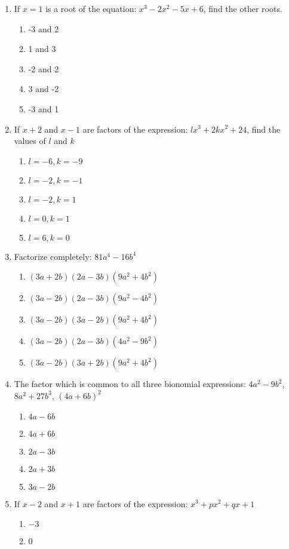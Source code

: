 \begin{multicols}{2}
\begin{enumerate}[label={\arabic*.}]
\item If \(x=1\) is a root of the equation: \(x^3-2x^2-5x+6\), find the other roots.
	\begin{enumerate}[label={\Alph*.}]
	\item -3 and 2
	\item 1 and 3
	\item -2 and 2
	\item 3 and -2
	\item -3 and 1
	\end{enumerate}
\item If \(x+2\) and \(x-1\) are factors of the expression: \(lx^3+2kx^2+24\), find the values of \(l\) and \(k\)
	\begin{enumerate}[label={\Alph*.}]
	\item \(l=-6, k=-9\)
	\item \(l=-2, k=-1\)
	\item \(l=-2, k=1\)
	\item \(l=0, k=1\)
	\item \(l=6, k=0\)
	\end{enumerate}
\item Factorize completely: \(81a^4-16b^4\)
	\begin{enumerate}[label={\Alph*.}]
	\item \((3a+2b)(2a-3b)(9a^2+4b^2)\)
	\item \((3a-2b)(2a-3b)(9a^2-4b^2)\)
	\item \((3a-2b)(3a-2b)(9a^2+4b^2)\)
	\item \((3a-2b)(2a-3b)(4a^2-9b^2)\)
	\item \((3a-2b)(3a+2b)(9a^2+4b^2)\)
	\end{enumerate}
\item The factor which is common to all three bionomial expressions: \(4a^2-9b^2\), \(8a^2+27b^3\), \((4a+6b)^2\)
	\begin{enumerate}[label={\Alph*.}]
	\item \(4a-6b\)
	\item \(4a+6b\)
	\item \(2a-3b\)
	\item \(2a+3b\)
	\item \(3a-2b\)
	\end{enumerate}
\item If \(x-2\) and \(x+1\) are factors of the expression: \(x^3+px^2+qx+1\)
	\begin{enumerate}[label={\Alph*.}]
	\item \(-3\)
	\item \(0\)

\end{enumerate}
\end{enumerate}
\end{multicols}
